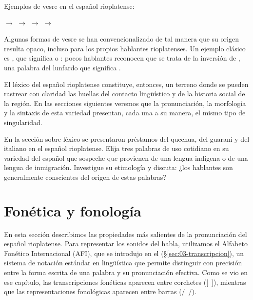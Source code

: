 \begin{exe}
  \ex\label{ex:15-vesre} Ejemplos de vesre en el español rioplatense:
    \begin{xlist}
      \ex {} $\rightarrow$ 
      \ex {} $\rightarrow$ 
      \ex {} $\rightarrow$ 
      \ex {} $\rightarrow$ 
    \end{xlist}
\end{exe}

Algunas formas de vesre se han convencionalizado de tal manera que su origen
resulta opaco, incluso para los propios hablantes rioplatenses. Un ejemplo
clásico es , que significa  o : pocos
hablantes reconocen que se trata de la inversión de , una palabra
del lunfardo que significa .

El léxico del español rioplatense constituye, entonces, un terreno donde se
pueden rastrear con claridad las huellas del contacto lingüístico y de la
historia social de la región. En las secciones siguientes veremos que la
pronunciación, la morfología y la sintaxis de esta variedad presentan, cada una a
su manera, el mismo tipo de singularidad.

\begin{ejercicio}\label{ej:15-prestamos}
En la sección sobre léxico se presentaron préstamos del quechua, del guaraní y
del italiano en el español rioplatense. Elija tres palabras de uso cotidiano en
su variedad del español que sospeche que provienen de una lengua indígena o de
una lengua de inmigración. Investigue su etimología y discuta: ¿los hablantes son
generalmente conscientes del origen de estas palabras?
\end{ejercicio}

\section{Fonética y fonología}\label{sec:15-fonetica}

En esta sección describimos las propiedades más salientes de la pronunciación
del español rioplatense. Para representar los sonidos del habla, utilizamos el
Alfabeto Fonético Internacional (AFI), que se introdujo en el 
(§\ref{sec:03-transcripcion}), un sistema de notación estándar en lingüística que
permite distinguir con precisión entre la forma escrita de una palabra y su
pronunciación efectiva. Como se vio en ese capítulo, las transcripciones
fonéticas aparecen entre corchetes ([~]), mientras que las representaciones
fonológicas aparecen entre barras (/~/).

